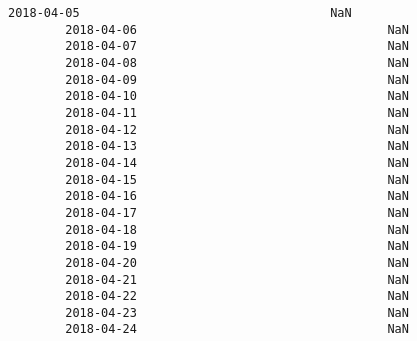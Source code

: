 \documentclass[11pt]{article}
\begin{document}
\begin{Verbatim}[commandchars=\\\{\}]
        2018-04-05                                   NaN   
        2018-04-06                                   NaN   
        2018-04-07                                   NaN   
        2018-04-08                                   NaN   
        2018-04-09                                   NaN   
        2018-04-10                                   NaN   
        2018-04-11                                   NaN   
        2018-04-12                                   NaN   
        2018-04-13                                   NaN   
        2018-04-14                                   NaN   
        2018-04-15                                   NaN   
        2018-04-16                                   NaN   
        2018-04-17                                   NaN   
        2018-04-18                                   NaN   
        2018-04-19                                   NaN   
        2018-04-20                                   NaN   
        2018-04-21                                   NaN   
        2018-04-22                                   NaN   
        2018-04-23                                   NaN   
        2018-04-24                                   NaN   
        

\end{Verbatim}
\end{document}
